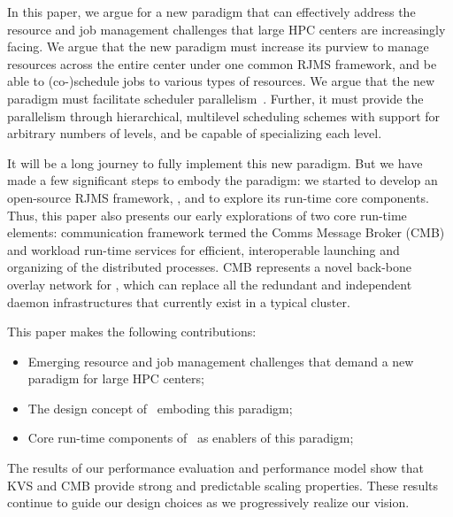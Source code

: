 In this paper, we argue for a new paradigm that can
effectively address the resource and job management 
challenges that large HPC centers are increasingly facing.
We argue that the new paradigm must increase its purview 
to manage resources across the entire center under
one common RJMS framework, and 
be able to (co-)schedule jobs to various types of resources.
We argue that the new paradigm must facilitate 
scheduler parallelism~\cite{Omega,Mesos}. Further, it must
provide the parallelism through hierarchical, multilevel 
scheduling schemes with support for arbitrary numbers of levels, and 
be capable of specializing each level.

It will be a long journey to fully implement this new paradigm. 
But we have made a few significant steps to embody the paradigm:
we started to develop an open-source RJMS framework, \flux,
and to explore its run-time core components.
Thus, this paper also presents our early explorations
of two core run-time elements: 
communication framework termed the Comms Message Broker (CMB)
and workload run-time services for efficient, interoperable
launching and organizing of the distributed processes.
CMB represents a novel back-bone overlay network for \flux,
which can replace all the redundant and independent
daemon infrastructures that currently exist in a typical cluster.

This paper makes the following contributions:
\begin{itemize}
\item{Emerging resource and job management challenges that demand a new paradigm for large HPC centers;}
\item{The design concept of \flux\ emboding this paradigm;}
\item{Core run-time components of \flux\ as enablers of this paradigm;}
\end{itemize}

The results of our performance evaluation 
and performance model show that KVS and CMB provide 
strong and predictable scaling properties.
These results continue to guide our design choices
as we progressively realize our vision. 

